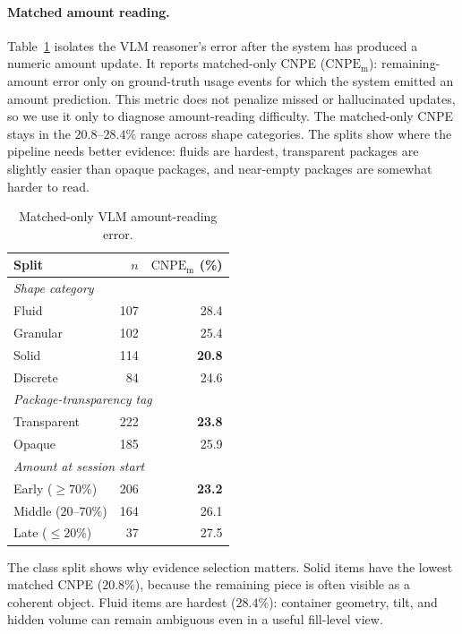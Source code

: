 \documentclass[sigconf,anonymous,nonacm]{acmart}
\begin{document}
\paragraph{Matched amount reading.}
Table~\ref{tab:breakdown-class} isolates the VLM reasoner's error after
the system has produced a numeric amount update. It reports
matched-only CNPE ($\mathrm{CNPE}_{\mathrm{m}}$): remaining-amount error
only on ground-truth usage events for which the system emitted an
amount prediction. This metric does not penalize missed or hallucinated
updates, so we use it only to diagnose amount-reading difficulty. The matched-only CNPE stays in the $20.8$--$28.4\%$
range across shape categories. The splits show where the pipeline needs
better evidence: fluids are hardest, transparent packages are slightly
easier than opaque packages, and near-empty packages are somewhat harder
to read.

\begin{table}[!htbp]
\centering
\small
\caption{Matched-only VLM amount-reading error.}
\label{tab:breakdown-class}
\begin{tabular}{lrr}
\toprule
Split & $n$ & $\mathrm{CNPE}_{\mathrm{m}}$ (\%) \\
\midrule
\multicolumn{3}{l}{\emph{Shape category}} \\
Fluid    & 107 & 28.4 \\
Granular & 102 & 25.4 \\
Solid    & 114 & \textbf{20.8} \\
Discrete &  84 & 24.6 \\
\midrule
\multicolumn{3}{l}{\emph{Package-transparency tag}} \\
Transparent & 222 & \textbf{23.8} \\
Opaque      & 185 & 25.9 \\
\midrule
\multicolumn{3}{l}{\emph{Amount at session start}} \\
Early ($\geq 70\%$)       & 206 & \textbf{23.2} \\
Middle ($20\text{--}70\%$) & 164 & 26.1 \\
Late ($\leq 20\%$)        &  37 & 27.5 \\
\bottomrule
\end{tabular}
\end{table}


The class split shows why evidence selection matters. Solid items have
the lowest matched CNPE ($20.8\%$), because the remaining piece is often
visible as a coherent object. Fluid items are hardest ($28.4\%$):
container geometry, tilt, and hidden volume can remain ambiguous even
in a useful fill-level view.
\end{document}

